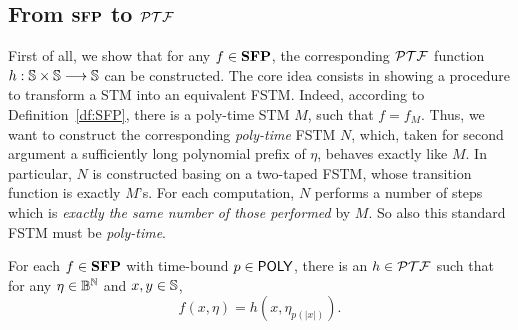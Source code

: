 \subsection{From $\mathbf{SFP}$ to $\mathcal{PTF}$}\label{sec:H}
First of all, we show that for any $f\in \mathbf{SFP}$,
the corresponding $\mathcal{PTF}$ function
$h:\mathbb{S} \times \mathbb{S}\longrightarrow \mathbb{S}$ can be constructed.
%
The core idea consists in showing a procedure
to transform a STM into an equivalent FSTM.
%
Indeed, according to Definition~\ref{df:SFP},
there is a poly-time STM $M$, such that $f=f_M$.
%
Thus, we want to construct the corresponding
\emph{poly-time} FSTM $N$, which,
taken for second argument a sufficiently long polynomial prefix of $\eta$,
behaves exactly like $M$.
%
In particular, $N$ is constructed basing on a
two-taped FSTM, whose transition function is exactly
$M$'s.
%
For each computation,
$N$ performs a number of steps which
is \emph{exactly the same number of those performed} by $M$.
So also this standard FSTM must be \emph{poly-time}.



\begin{lemma}\label{lemma:SFPtopolyF}
For each $f\in \mathbf{SFP}$ with time-bound $p\in \mathsf{POLY}$,
there is an $h \in \mathcal{PTF}$ such that
for any $\eta\in \mathbb{B}^{\mathbb{N}}$ and $x, y\in \mathbb{S}$,
$$
f(x,\eta) = h(x, \eta_{p(|x|)}).
$$
\end{lemma}



